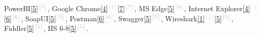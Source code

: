 \begin{cventries}
{\begin{cvitems}
{		%
		\textcolor{rainbowcolor-olive}{PowerBI\textcolor{darkgray}{\ref{5}{$^{[5]}$}}}, 
        \textcolor{rainbowcolor-olive}{Google Chrome\textcolor{lightgray}{\ref{4}{$^{[4]}$}}\textcolor{darkgray}{\ref{7}{$^{[7]}$}}},
        \textcolor{rainbowcolor-olive}{MS Edge\textcolor{darkgray}{\ref{5}{$^{[6]}$}}},
        \textcolor{rainbowcolor-olive}{Internet Explorer\textcolor{lightgray}{\ref{4}{$^{[4]}$}}\textcolor{darkgray}{\ref{6}{$^{[6]}$}}},
        \textcolor{rainbowcolor-olive}{SoapUI\textcolor{darkgray}{\ref{5}{$^{[5]}$}}},
        \textcolor{rainbowcolor-olive}{Postman\textcolor{darkgray}{\ref{6}{$^{[6]}$}}},
        \textcolor{rainbowcolor-olive}{Swagger\textcolor{darkgray}{\ref{5}{$^{[5]}$}}},    
        \textcolor{rainbowcolor-olive}{Wireshark\textcolor{lightgray}{\ref{1}{$^{[1]}$}}\textcolor{darkgray}{\ref{5}{$^{[5]}$}}},    
        \textcolor{rainbowcolor-olive}{Fiddler\textcolor{darkgray}{\ref{5}{$^{[5]}$}}},  
        \textcolor{rainbowcolor-olive}{IIS 6-8\textcolor{darkgray}{\ref{5}{$^{[5]}$}}}.%
		}
      \end{cvitems}
    }  
      

\end{cventries}
